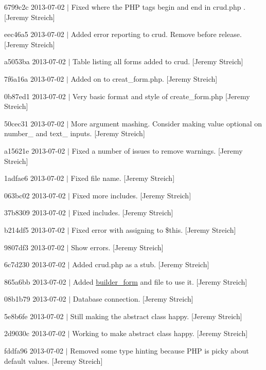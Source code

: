 \begin{DoxyItemize}
\item 6799c2c 2013-\/07-\/02 $|$ Fixed where the P\-H\-P tags begin and end in crud.\-php . \mbox{[}Jeremy Streich\mbox{]}
\item eec46a5 2013-\/07-\/02 $|$ Added error reporting to crud. Remove before release. \mbox{[}Jeremy Streich\mbox{]}
\item a5053ba 2013-\/07-\/02 $|$ Table listing all forms added to crud. \mbox{[}Jeremy Streich\mbox{]}
\item 7f6a16a 2013-\/07-\/02 $|$ Added on to creat\-\_\-form.\-php. \mbox{[}Jeremy Streich\mbox{]}
\item 0b87ed1 2013-\/07-\/02 $|$ Very basic format and style of create\-\_\-form.\-php \mbox{[}Jeremy Streich\mbox{]}
\item 50cec31 2013-\/07-\/02 $|$ More argument mashing. Consider making value optional on number\-\_\- and text\-\_\- inputs. \mbox{[}Jeremy Streich\mbox{]}
\item a15621e 2013-\/07-\/02 $|$ Fixed a number of issues to remove warnings. \mbox{[}Jeremy Streich\mbox{]}
\item 1adfae6 2013-\/07-\/02 $|$ Fixed file name. \mbox{[}Jeremy Streich\mbox{]}
\item 063bc02 2013-\/07-\/02 $|$ Fixed more includes. \mbox{[}Jeremy Streich\mbox{]}
\item 37b8309 2013-\/07-\/02 $|$ Fixed includes. \mbox{[}Jeremy Streich\mbox{]}
\item b214df5 2013-\/07-\/02 $|$ Fixed error with assigning to \$this. \mbox{[}Jeremy Streich\mbox{]}
\item 9807df3 2013-\/07-\/02 $|$ Show errors. \mbox{[}Jeremy Streich\mbox{]}
\item 6c7d230 2013-\/07-\/02 $|$ Added crud.\-php as a stub. \mbox{[}Jeremy Streich\mbox{]}
\item 865a6bb 2013-\/07-\/02 $|$ Added \hyperlink{classbuilder__form}{builder\-\_\-form} and file to use it. \mbox{[}Jeremy Streich\mbox{]}
\item 08b1b79 2013-\/07-\/02 $|$ Database connection. \mbox{[}Jeremy Streich\mbox{]}
\item 5e8b6fe 2013-\/07-\/02 $|$ Still making the abstract class happy. \mbox{[}Jeremy Streich\mbox{]}
\item 2d9030c 2013-\/07-\/02 $|$ Working to make abstract class happy. \mbox{[}Jeremy Streich\mbox{]}
\item fddfa96 2013-\/07-\/02 $|$ Removed some type hinting because P\-H\-P is picky about default values. \mbox{[}Jeremy Streich\mbox{]}

\end{DoxyItemize}
